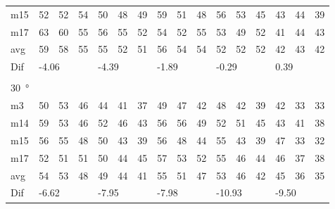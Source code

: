 \begin{table}[H]
\begin{tabular}{l|l|l|l|l|l|l|l|l|l|l|l|l|lll}
m15  &  52    & 52     &   54   &  50    &  48    &  49    & 59     &    51   &   48   &   56    &   53   &   45   & \multicolumn{1}{l|}{43} & \multicolumn{1}{l|}{44} & 39 \\
m17  &  63    & 60     &  55    &  56    & 55     &  52    &  54    &   52    &    55  &   53    &   49   & 52     & \multicolumn{1}{l|}{41} & \multicolumn{1}{l|}{44} & 43 \\ \hline
avg & 59     & 58     &  55    &  55    &  52    &  51    &  56    &   54    & 54     &    52   &   52   &  52    & \multicolumn{1}{l|}{42} & \multicolumn{1}{l|}{43}  & 42  \\ \hline  
Dif & \multicolumn{3}{l|}{-4.06} & \multicolumn{3}{l|}{-4.39} & \multicolumn{3}{l|}{-1.89} & \multicolumn{3}{l|}{-0.29} & \multicolumn{3}{l}{0.39} \\ 
 \multicolumn{16}{l}{ } \\                             
\SI{30}{\degree}   & \multicolumn{3}{l|}{} & \multicolumn{3}{l|}{} & \multicolumn{3}{l|}{} & \multicolumn{3}{l|}{} & \multicolumn{3}{l}{}   \\  \hline
m3    & 50     &  53    &  46    &  44    &  41    &  37    &  49    &   47    &   42   &   48    &  42    &   39   & \multicolumn{1}{l|}{42} & \multicolumn{1}{l|}{33} &33  \\
m14  & 59     &  53    &  46    &  52    &   46   &  43    &  56    &  56     &  49    &   52    &   51   &   45   & \multicolumn{1}{l|}{43} & \multicolumn{1}{l|}{41} & 38 \\
m15  &  56    &  55    &  48    &   50   &   43   &   39   &   56   &  48     & 44     &    55   &   43   &   39   & \multicolumn{1}{l|}{47} & \multicolumn{1}{l|}{33} & 32 \\
m17  & 52     &  51    &  51    &  50    &  44    &    45  &   57   &   53    &  52    &  55     &  46    &   44   & \multicolumn{1}{l|}{46} & \multicolumn{1}{l|}{37} &  38\\ \hline
avg &  54    & 53     &  48    &  49    &  44    &  41    &  55    &   51    &  47    &   53    &   46   &  42    & \multicolumn{1}{l|}{45} & \multicolumn{1}{l|}{36}  & 35 \\ \hline  
Dif & \multicolumn{3}{l|}{-6.62} & \multicolumn{3}{l|}{-7.95} & \multicolumn{3}{l|}{-7.98} & \multicolumn{3}{l|}{-10.93} & \multicolumn{3}{l}{-9.50}                        
\end{tabular}
\end{table}


